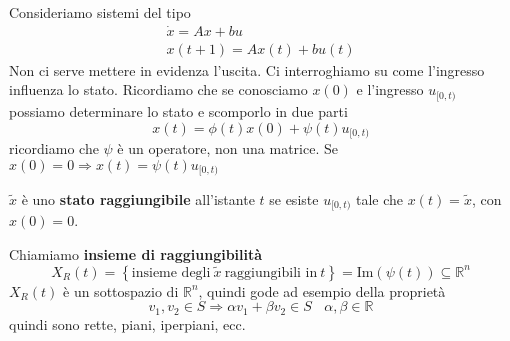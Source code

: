 \documentclass[10pt,a4paper]{book}
\begin{document}
\begin{figure}[htpb]\centering
{} %

\end{figure}\FloatBarrier

Consideriamo sistemi del tipo
\begin{gather*}
\dot{x} =Ax+bu\\
x( t+1) =Ax( t) +bu( t)
\end{gather*}
Non ci serve mettere in evidenza l'uscita. Ci interroghiamo su come l'ingresso influenza lo stato. Ricordiamo che se conosciamo $x( 0)$ e l'ingresso $u_{[ 0,t)}$ possiamo determinare lo stato e scomporlo in due parti
\begin{equation*}
x( t) =\phi ( t) x( 0) +\psi ( t) u_{[ 0,t)}
\end{equation*}
ricordiamo che $\psi $ è un operatore, non una matrice. Se $x( 0) =0\Rightarrow x( t) =\psi ( t) u_{[ 0,t)}$
\begin{definition}
$\tilde{x}$ è uno \textbf{stato raggiungibile} all'istante $t$ se esiste $u_{[ 0,t)}$ tale che $x( t) =\tilde{x}$, con $x( 0) =0$.
\end{definition}
Chiamiamo \textbf{insieme di raggiungibilità}
\begin{equation*}
X_{R}( t) =\left\{\text{insieme degli} \ \tilde{x} \ \text{raggiungibili in} \ t\right\} =\mathrm{Im}( \psi ( t)) \subseteq \mathbb{R}^{n}
\end{equation*}
$X_{R}( t)$ è un sottospazio di $\mathbb{R}^{n}$, quindi gode ad esempio della proprietà
\begin{equation*}
v_{1} ,v_{2} \in S\Rightarrow \alpha v_{1} +\beta v_{2} \in S\ \ \ \ \alpha ,\beta \in \mathbb{R}
\end{equation*}
quindi sono rette, piani, iperpiani, ecc.
\end{document}
